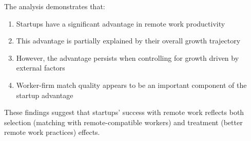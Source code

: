 \documentclass[11pt]{article}
\begin{document}
The analysis demonstrates that:
\begin{enumerate}
\item Startups have a significant advantage in remote work productivity
\item This advantage is partially explained by their overall growth trajectory
\item However, the advantage persists when controlling for growth driven by external factors
\item Worker-firm match quality appears to be an important component of the startup advantage
\end{enumerate}

These findings suggest that startups' success with remote work reflects both selection (matching with remote-compatible workers) and treatment (better remote work practices) effects.
\end{document}
